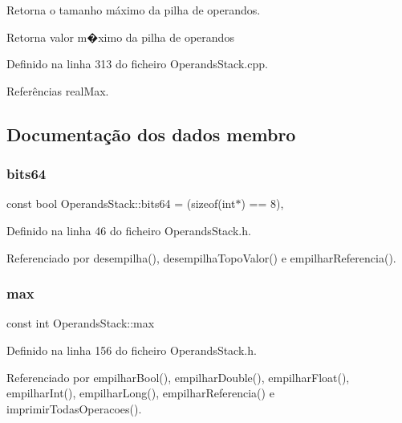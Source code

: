 Retorna o tamanho máximo da pilha de operandos. 

Retorna valor m�ximo da pilha de operandos 

Definido na linha 313 do ficheiro Operands\+Stack.\+cpp.



Referências real\+Max.



\subsection{Documentação dos dados membro}
\mbox{\label{classOperandsStack_a52dbb05109d9b5c88bae178c6fdf00b3}} 
\subsubsection{\texorpdfstring{bits64}{bits64}}
{\footnotesize\ttfamily const bool Operands\+Stack\+::bits64 = (sizeof(int$\ast$) == 8)\hspace{0.3cm}{\ttfamily [static]}, {\ttfamily [private]}}



Definido na linha 46 do ficheiro Operands\+Stack.\+h.



Referenciado por desempilha(), desempilha\+Topo\+Valor() e empilhar\+Referencia().

\mbox{\label{classOperandsStack_ac17a81af6a26d029042e6c7ad598a538}} 
\subsubsection{\texorpdfstring{max}{max}}
{\footnotesize\ttfamily const int Operands\+Stack\+::max}



Definido na linha 156 do ficheiro Operands\+Stack.\+h.



Referenciado por empilhar\+Bool(), empilhar\+Double(), empilhar\+Float(), empilhar\+Int(), empilhar\+Long(), empilhar\+Referencia() e imprimir\+Todas\+Operacoes().

\mbox{\label{classOperandsStack_aac5d565f6032231c195411ba4d75d571}} 
